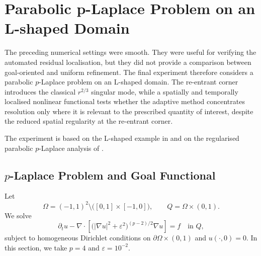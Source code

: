 \section{Parabolic p-Laplace Problem on an L-shaped Domain}
\label{sec:lshape-plaplace}

The preceding numerical settings were smooth. They were useful for verifying the automated residual localisation, but they did not provide a comparison between goal-oriented and uniform refinement. The final experiment therefore considers a parabolic $p$-Laplace problem on an L-shaped domain. The re-entrant corner introduces the classical $r^{2/3}$ singular mode, while a spatially and temporally localised nonlinear functional tests whether the adaptive method concentrates resolution only where it is relevant to the prescribed quantity of interest, despite the reduced spatial regularity at the re-entrant corner.

The experiment is based on the L-shaped example in \cite[Section~6.4]{ENDTMAYER202419} and on the regularised parabolic $p$-Laplace analysis of \cite{R6}. 


\subsection{$p$-Laplace Problem and Goal Functional}
\label{subsec:lshape-benchmark}

Let
\begin{equation}
  \Omega=(-1,1)^2\setminus\bigl([0,1]\times[-1,0]\bigr),
  \qquad Q=\Omega\times(0,1).
  \label{eq:lshape-domain}
\end{equation}
We solve
\begin{equation}
  \partial_t u
  -\nabla\cdot\left[
    \bigl(|\nabla u|^2+\varepsilon^2\bigr)^{(p-2)/2}\nabla u
  \right]
  =f
  \quad\text{in }Q,
  \label{eq:lshape-plaplace}
\end{equation}
subject to homogeneous Dirichlet conditions on $\partial\Omega\times(0,1)$ and $u(\cdot,0)=0$. In this section, we take $p=4$ and $\varepsilon=10^{-2}$. 

